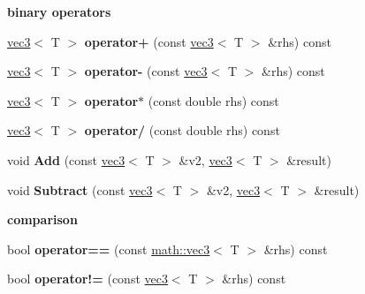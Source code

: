 \begin{Indent}{\bf binary operators}\par
{\em \label{_amgrp04c8a55c25fdc9a3444da113de31256d}
 }\begin{DoxyCompactItemize}
\item 
\hypertarget{classmath_1_1vec3_adaf198c54d56f4bf4493b91919f6eb8e}{
\hyperlink{classmath_1_1vec3}{vec3}$<$ T $>$ {\bfseries operator+} (const \hyperlink{classmath_1_1vec3}{vec3}$<$ T $>$ \&rhs) const }
\label{classmath_1_1vec3_adaf198c54d56f4bf4493b91919f6eb8e}

\item 
\hypertarget{classmath_1_1vec3_ab79da731edca6736172a2ec4bc7a9be7}{
\hyperlink{classmath_1_1vec3}{vec3}$<$ T $>$ {\bfseries operator-\/} (const \hyperlink{classmath_1_1vec3}{vec3}$<$ T $>$ \&rhs) const }
\label{classmath_1_1vec3_ab79da731edca6736172a2ec4bc7a9be7}

\item 
\hypertarget{classmath_1_1vec3_a0158485443f1a333c17d68f48ec1534b}{
\hyperlink{classmath_1_1vec3}{vec3}$<$ T $>$ {\bfseries operator$\ast$} (const double rhs) const }
\label{classmath_1_1vec3_a0158485443f1a333c17d68f48ec1534b}

\item 
\hypertarget{classmath_1_1vec3_afb842d06e9ee3d446c01b16ed870f20b}{
\hyperlink{classmath_1_1vec3}{vec3}$<$ T $>$ {\bfseries operator/} (const double rhs) const }
\label{classmath_1_1vec3_afb842d06e9ee3d446c01b16ed870f20b}

\item 
\hypertarget{classmath_1_1vec3_ab0578e01e8adbea1568501ce11170ba1}{
void {\bfseries Add} (const \hyperlink{classmath_1_1vec3}{vec3}$<$ T $>$ \&v2, \hyperlink{classmath_1_1vec3}{vec3}$<$ T $>$ \&result)}
\label{classmath_1_1vec3_ab0578e01e8adbea1568501ce11170ba1}

\item 
\hypertarget{classmath_1_1vec3_a768ea8bebdeb56697afe8446e551549c}{
void {\bfseries Subtract} (const \hyperlink{classmath_1_1vec3}{vec3}$<$ T $>$ \&v2, \hyperlink{classmath_1_1vec3}{vec3}$<$ T $>$ \&result)}
\label{classmath_1_1vec3_a768ea8bebdeb56697afe8446e551549c}

\end{DoxyCompactItemize}
\end{Indent}
\begin{Indent}{\bf comparison}\par
{\em \label{_amgrp347cd68a17ba31d02e83262794a3c9e3}
 }\begin{DoxyCompactItemize}
\item 
\hypertarget{classmath_1_1vec3_a2f2dfd6ab85413e1e6cb890eac45a0ab}{
bool {\bfseries operator==} (const \hyperlink{classmath_1_1vec3}{math::vec3}$<$ T $>$ \&rhs) const }
\label{classmath_1_1vec3_a2f2dfd6ab85413e1e6cb890eac45a0ab}

\item 
\hypertarget{classmath_1_1vec3_a826506266eb9749d197e1fcaf2a84904}{
bool {\bfseries operator!=} (const \hyperlink{classmath_1_1vec3}{vec3}$<$ T $>$ \&rhs) const }
\label{classmath_1_1vec3_a826506266eb9749d197e1fcaf2a84904}

\end{DoxyCompactItemize}
\end{Indent}
